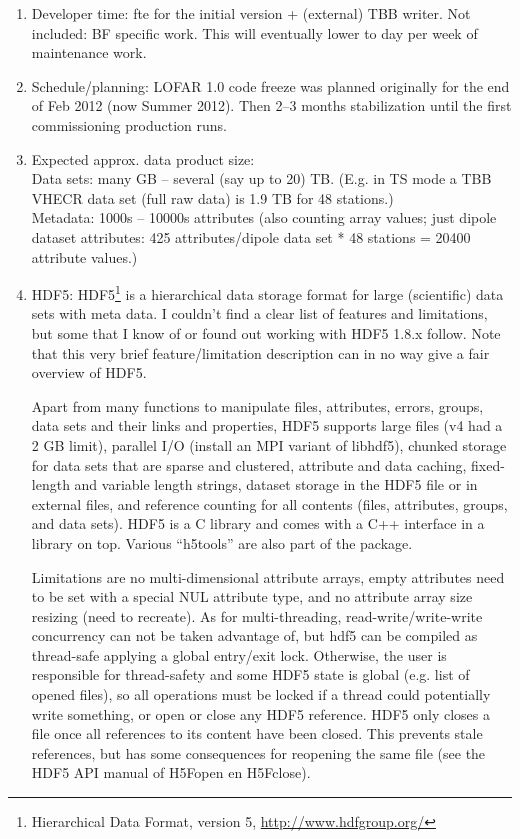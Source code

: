 \documentclass[a4paper,11pt]{article}
\begin{document}
\begin{enumerate}[label=\it E.\arabic{*}]
\itemsep0em

\item \label{env:dev_time} Developer time:  fte for the initial version + (external) TBB writer. Not included: BF specific work. This will eventually lower to  day per week of maintenance work.

\item \label{env:sched} Schedule/planning: LOFAR 1.0 code freeze was planned originally for the end of Feb 2012 (now Summer 2012).
Then 2--3 months stabilization until the first commissioning production runs.

\item \label{env:data_size} Expected approx. data product size:\\
Data sets: many GB -- several (say up to 20) TB. (E.g. in TS mode a TBB VHECR data set (full raw data) is 1.9 TB for 48 stations.)\\
Metadata: 1000s -- 10000s attributes (also counting array values; just dipole dataset attributes: 425 attributes/dipole data set * 48 stations = 20400 attribute values.)

\item \label{env:HDF5} HDF5: HDF5\footnote{Hierarchical Data Format, version 5, \url{http://www.hdfgroup.org/}} is a hierarchical data storage format for large (scientific) data sets with meta data.
I couldn't find a clear list of features and limitations, but some that I know of or found out working with HDF5 1.8.x follow.
Note that this very brief feature/limitation description can in no way give a fair overview of HDF5.

Apart from many functions to manipulate files, attributes, errors, groups, data sets and their links and properties, HDF5 supports large files (v4 had a 2 GB limit), parallel I/O (install an MPI variant of libhdf5), chunked storage for data sets that are sparse and clustered, attribute and data caching, fixed-length and variable length strings, dataset storage in the HDF5 file or in external files, and reference counting for all contents (files, attributes, groups, and data sets).
HDF5 is a C library and comes with a C++ interface in a library on top.
Various ``h5tools'' are also part of the package.

Limitations are no multi-dimensional attribute arrays, empty attributes need to be set with a special NUL attribute type, and no attribute array size resizing (need to recreate).
As for multi-threading, read-write/write-write concurrency can not be taken advantage of, but hdf5 can be compiled as thread-safe applying a global entry/exit lock.
Otherwise, the user is responsible for thread-safety and some HDF5 state is global (e.g. list of opened files), so all operations must be locked if a thread could potentially write something, or open or close any HDF5 reference.
HDF5 only closes a file once all references to its content have been closed.
This prevents stale references, but has some consequences for reopening the same file (see the HDF5 API manual of H5Fopen en H5Fclose).


\end{enumerate}
\end{document}
